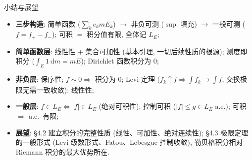 


\begin{frame}{小结与展望}

\begin{itemize}
\item \textbf{三步构造}: 简单函数 ($\sum_k c_k m E_k$) $\to$ 非负可测 ($\sup$ 填充)
  $\to$ 一般可测 ($f = f_+ - f_-$); 可积 $=$ 积分值有限, 全体记 $L_E$;
\pause
\item \textbf{简单函数层}: 线性性 + 集合可加性 (基本引理, 一切后续性质的根源);
  测度即积分 ($\int_E 1 ~ \mathrm{d} m = mE$); Dirichlet 函数积分为 $0$;
\pause
\item \textbf{非负层}: 保序性; $f \sim 0 \Rightarrow$ 积分为 $0$; \alert{Levi 定理}
  ($f_k \uparrow f \Rightarrow \int f_k \to \int f$, 交换极限无需一致收敛); 线性性;
\pause
\item \textbf{一般层}: $f \in L_E \iff |f| \in L_E$ (绝对可积性); 控制可积
  ($|f| \leqslant g \in L_E$ a.e.); 可积 $\Rightarrow$ a.e.\ 有限;
\pause
\item \textbf{展望}: §4.2 建立积分的完整性质 (线性、可加性、\alert{绝对连续性});
  §4.3 极限定理的一般形式 (Levi 级数形式、Fatou、Lebesgue 控制收敛),
  勒贝格积分相对 Riemann 积分的最大优势所在.
\end{itemize}

\end{frame}





